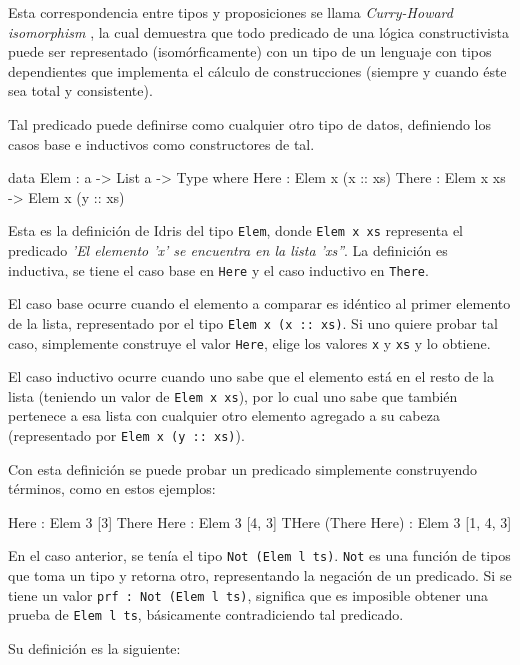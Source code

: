 Esta correspondencia entre tipos y proposiciones se llama \textit{Curry-Howard isomorphism} \cite{Howard80}, la cual demuestra que todo predicado de una lógica constructivista puede ser representado (isomórficamente) con un tipo de un lenguaje con tipos dependientes que implementa el cálculo de construcciones (siempre y cuando éste sea total y consistente).

Tal predicado puede definirse como cualquier otro tipo de datos, definiendo los casos base e inductivos como constructores de tal.

\begin{code}
data Elem : a -> List a -> Type where
  Here : Elem x (x :: xs)
  There : Elem x xs -> Elem x (y :: xs)
\end{code}

Esta es la definición de Idris del tipo \texttt{Elem}, donde \texttt{Elem x xs} representa el predicado \textit{'El elemento 'x' se encuentra en la lista 'xs''}. La definición es inductiva, se tiene el caso base en \texttt{Here} y el caso inductivo en \texttt{There}.

El caso base ocurre cuando el elemento a comparar es idéntico al primer elemento de la lista, representado por el tipo \texttt{Elem x (x :: xs)}. Si uno quiere probar tal caso, simplemente construye el valor \texttt{Here}, elige los valores \texttt{x} y \texttt{xs} y lo obtiene.

El caso inductivo ocurre cuando uno sabe que el elemento está en el resto de la lista (teniendo un valor de \texttt{Elem x xs}), por lo cual uno sabe que también pertenece a esa lista con cualquier otro elemento agregado a su cabeza (representado por \texttt{Elem x (y :: xs)}).

Con esta definición se puede probar un predicado simplemente construyendo términos, como en estos ejemplos:

\begin{code}
Here : Elem 3 [3]
There Here : Elem 3 [4, 3]
THere (There Here) : Elem 3 [1, 4, 3]
\end{code}

En el caso anterior, se tenía el tipo \texttt{Not (Elem l ts)}. \texttt{Not} es una función de tipos que toma un tipo y retorna otro, representando la negación de un predicado. Si se tiene un valor \texttt{prf : Not (Elem l ts)}, significa que es imposible obtener una prueba de \texttt{Elem l ts}, básicamente contradiciendo tal predicado.

Su definición es la siguiente:

